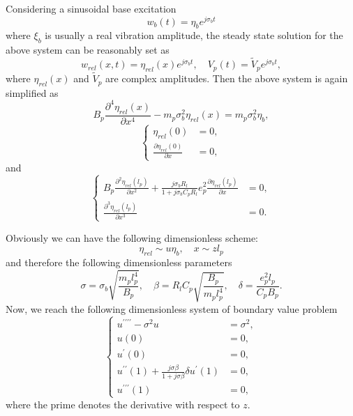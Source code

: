 \documentclass{article}
\begin{document}
Considering a sinusoidal base excitation
\begin{equation}
    w_b(t) = \eta_b e^{j \sigma_b t}
\end{equation}
where $\xi_b$ is usually a real vibration amplitude, the steady state solution for the above system can be reasonably set as
\begin{equation}
    w_{rel}(x,t) = \eta_{rel}(x) e^{j \sigma_b t},\quad V_p(t) = \tilde{V}_p e^{j \sigma_b t},
\end{equation}
where $\eta_{rel}(x)$ and $\tilde{V}_p$ are complex amplitudes. Then the above system is again simplified as 
\begin{equation}
    B_p \frac{\partial^4 \eta_{rel}(x)}{\partial x^4} - m_p \sigma_b^2 \eta_{rel}(x) = m_p \sigma_b^2 \eta_{b},
\end{equation}
\begin{equation}
    \left\{\begin{aligned}
        \eta_{rel}(0) &= 0, \\
        \frac{\partial \eta_{rel}(0)}{\partial x} &= 0,
    \end{aligned}\right.
\end{equation}
and
\begin{equation}
    \left\{\begin{aligned}
        B_p \frac{\partial^2 \eta_{rel}(l_p)}{\partial x^2} + \frac{j \sigma_b R_l }{1 + j \sigma_b C_p R_l } e_p^2 \frac{\partial \eta_{rel}(l_p)}{\partial x} &= 0, \\
        \frac{\partial^3 \eta_{rel}(l_p)}{\partial x^3} &= 0.
    \end{aligned}\right.
\end{equation}



Obviously we can have the following dimensionless scheme:
\begin{equation}
    \eta_{rel} \sim u \eta_b ,\quad x \sim z l_p 
\end{equation}
and therefore the following dimensionless parameters
\begin{equation}
    \sigma = \sigma_b \sqrt{\frac{m_p l_p^4}{B_p}}, \quad \beta = R_l C_p \sqrt{\frac{B_p}{m_p l_p^4}}, \quad \delta = \frac{e_p^2 l_p}{C_p B_p}.
\end{equation}
Now, we reach the following dimensionless system of boundary value problem
\begin{equation}
    \left\{\begin{aligned}
        u^{\prime\prime\prime\prime} -\sigma^2 u &= \sigma^2, \\
        u(0) &= 0, \\
        u^{\prime}(0) &= 0, \\
        u^{\prime\prime}(1)  + \frac{j \sigma \beta }{1 + j \sigma \beta } \delta u^{\prime}(1) &= 0, \\
        u^{\prime\prime\prime}(1) &= 0,
    \end{aligned}\right.
\end{equation}
where the prime denotes the derivative with respect to $z$.
\end{document}
